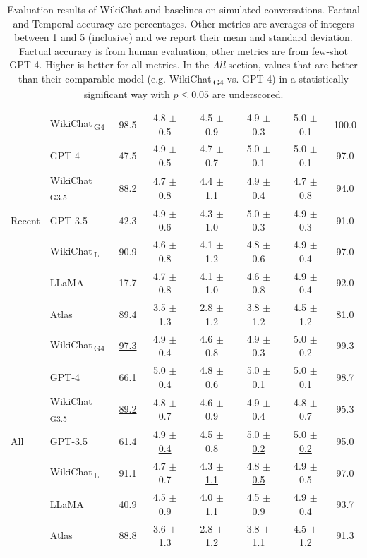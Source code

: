 \documentclass[11pt]{article}
\newcommand{\system}[0]{WikiChat\xspace}
\newcommand{\systemgt}[0]{WikiChat$\,$\textsubscript{G3.5}\xspace}
\newcommand{\systemgf}[0]{WikiChat$\,$\textsubscript{G4}\xspace}
\newcommand{\systeml}[0]{WikiChat$\,$\textsubscript{L}\xspace}
\begin{document}
\begin{table}[ht]
{\begin{tabular}{l l c c c c c c}
       & \systemgf & 98.5 & 4.8 $\pm$ 0.5 & 4.5 $\pm$ 0.9 & 4.9 $\pm$ 0.3 & 5.0 $\pm$ 0.1 & 100.0 \\
       & GPT-4     & 47.5 & 4.9 $\pm$ 0.5 & 4.7 $\pm$ 0.7 & 5.0 $\pm$ 0.1 & 5.0 $\pm$ 0.1 & 97.0 \\
 & \systemgt & 88.2 & 4.7 $\pm$ 0.8 & 4.4 $\pm$ 1.1 & 4.9 $\pm$ 0.4 & 4.7 $\pm$ 0.8 & 94.0 \\
Recent       & GPT-3.5   & 42.3 & 4.9 $\pm$ 0.6 & 4.3 $\pm$ 1.0 & 5.0 $\pm$ 0.3 & 4.9 $\pm$ 0.3 & 91.0 \\
       & \systeml  & 90.9 & 4.6 $\pm$ 0.8 & 4.1 $\pm$ 1.2 & 4.8 $\pm$ 0.6 & 4.9 $\pm$ 0.4 & 97.0 \\
       & LLaMA     & 17.7 &  4.7 $\pm$ 0.8 & 4.1 $\pm$ 1.0 & 4.6 $\pm$ 0.8 & 4.9 $\pm$ 0.4 & 92.0 \\
       & Atlas     & 89.4 & 3.5 $\pm$ 1.3 & 2.8 $\pm$ 1.2 & 3.8 $\pm$ 1.2 & 4.5 $\pm$ 1.2 & 81.0 \\
 \hline
 
       & \systemgf & \underline{97.3} & 4.9 $\pm$ 0.4 & 4.6 $\pm$ 0.8 & 4.9 $\pm$ 0.3 & 5.0 $\pm$ 0.2 & 99.3 \\
       & GPT-4     & 66.1 & \underline{5.0 $\pm$ 0.4} & 4.8 $\pm$ 0.6 & \underline{5.0 $\pm$ 0.1} & 5.0 $\pm$ 0.1 & 98.7 \\
   & \systemgt & \underline{89.2} & 4.8 $\pm$ 0.7 & 4.6 $\pm$ 0.9 & 4.9 $\pm$ 0.4 & 4.8 $\pm$ 0.7 & 95.3 \\
 All       & GPT-3.5   & 61.4 & \underline{4.9 $\pm$ 0.4} & 4.5 $\pm$ 0.8 & \underline{5.0 $\pm$ 0.2} & \underline{5.0 $\pm$ 0.2} & 95.0 \\
       & \systeml  & \underline{91.1} & 4.7 $\pm$ 0.7 & \underline{4.3 $\pm$ 1.1} & \underline{4.8 $\pm$ 0.5} & 4.9 $\pm$ 0.5 & 97.0 \\
       & LLaMA     & 40.9 & 4.5 $\pm$ 0.9 & 4.0 $\pm$ 1.1 & 4.5 $\pm$ 0.9 & 4.9 $\pm$ 0.4 & 93.7 \\
       & Atlas     & 88.8 & 3.6 $\pm$ 1.3 & 2.8 $\pm$ 1.2 & 3.8 $\pm$ 1.1 & 4.5 $\pm$ 1.2 & 91.3 \\

 \hline
\end{tabular}
}
\caption{Evaluation results of \system and baselines on simulated conversations. Factual and Temporal accuracy are percentages. Other metrics are averages of integers between 1 and 5 (inclusive) and we report their mean and standard deviation. Factual accuracy is from human evaluation, other metrics are from few-shot GPT-4.
Higher is better for all metrics. In the \emph{All} section, values that are better than their comparable model (e.g. \systemgf vs. GPT-4) in a statistically significant way with $p \leq 0.05$ are underscored.}
    \vspace{-1em}
\label{table:results}
\end{table}
\end{document}
